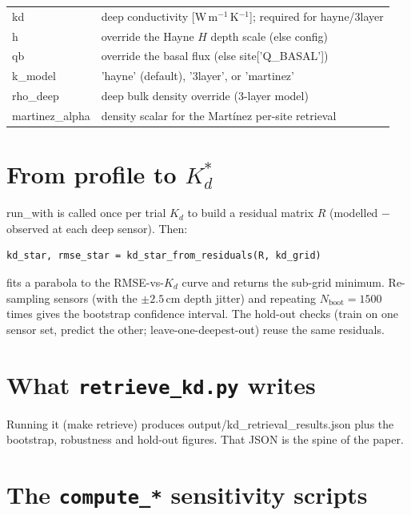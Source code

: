 \documentclass[11pt]{report}
\newcommand{\code}[1]{{\ttfamily\small #1}}
\newcommand{\file}[1]{\textcolor{forest}{\ttfamily #1}}
\begin{document}
\begin{center}\small
\begin{tabular}{@{}lp{9.8cm}@{}}
\toprule
\code{kd} & deep conductivity [W\,m$^{-1}$\,K$^{-1}$]; required for \code{hayne}/\code{3layer} \\
\code{h} & override the Hayne $H$ depth scale (else config) \\
\code{qb} & override the basal flux (else \code{site['Q\_BASAL']}) \\
\code{k\_model} & \code{'hayne'} (default), \code{'3layer'}, or \code{'martinez'} \\
\code{rho\_deep} & deep bulk density override (3-layer model) \\
\code{martinez\_alpha} & density scalar for the Mart\'inez per-site retrieval \\
\bottomrule
\end{tabular}
\end{center}

\section{From profile to $K_d^{*}$}

\code{run\_with} is called once per trial $K_d$ to build a residual matrix
$R$ (modelled $-$ observed at each deep sensor). Then:

\begin{lstlisting}[style=py]
kd_star, rmse_star = kd_star_from_residuals(R, kd_grid)
\end{lstlisting}

fits a parabola to the RMSE-vs-$K_d$ curve and returns the sub-grid
minimum. Re-sampling sensors (with the $\pm2.5$\,cm depth jitter) and
repeating $N_{\mathrm{boot}}=1500$ times gives the bootstrap confidence
interval. The hold-out checks (train on one sensor set, predict the other;
leave-one-deepest-out) reuse the same residuals.

\section{What \texttt{retrieve\_kd.py} writes}

Running it (\code{make retrieve}) produces
\file{output/kd\_retrieval\_results.json} plus the bootstrap, robustness
and hold-out figures. That JSON is the spine of the paper.

\section{The \texttt{compute\_*} sensitivity scripts}
\end{document}
